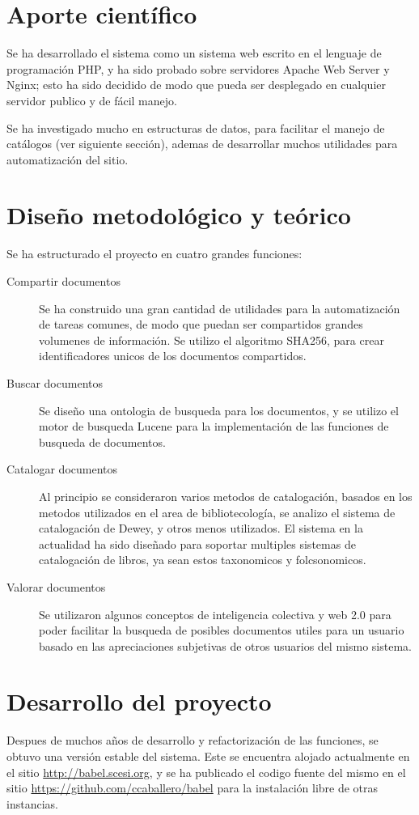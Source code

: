 \documentclass[letter,11pt,oneside,spanish]{article}
\begin{document}
\section{Aporte científico}
Se ha desarrollado el sistema como un sistema web escrito en el lenguaje de programación PHP, y ha 
sido probado sobre servidores Apache Web Server y Nginx; esto ha sido decidido de modo que pueda
ser desplegado en cualquier servidor publico y de fácil manejo.

Se ha investigado mucho en estructuras de datos, para facilitar el manejo de catálogos (ver siguiente
sección), ademas de desarrollar muchos utilidades para automatización del sitio.

\section{Diseño metodológico y teórico}
Se ha estructurado el proyecto en cuatro grandes funciones:

\begin{description}
\item [Compartir documentos]
    Se ha construido una gran cantidad de utilidades para la automatización de tareas comunes,
    de modo que puedan ser compartidos grandes volumenes de información.
    Se utilizo el algoritmo SHA256, para crear identificadores unicos de los documentos compartidos.
\item [Buscar documentos]
    Se diseño una ontologia de busqueda para los documentos, y se utilizo el motor de busqueda Lucene
    para la implementación de las funciones de busqueda de documentos.
\item [Catalogar documentos]
    Al principio se consideraron varios metodos de catalogación, basados en los metodos utilizados en
    el area de bibliotecología, se analizo el sistema de catalogación de Dewey, y otros menos
    utilizados.
    El sistema en la actualidad ha sido diseñado para soportar multiples sistemas de catalogación de
    libros, ya sean estos taxonomicos y folcsonomicos.
\item [Valorar documentos]
    Se utilizaron algunos conceptos de inteligencia colectiva y web 2.0 para poder facilitar la
    busqueda de posibles documentos utiles para un usuario basado en las apreciaciones subjetivas
    de otros usuarios del mismo sistema.
\end{description}

\section{Desarrollo del proyecto}
Despues de muchos años de desarrollo y refactorización de las funciones, se obtuvo una versión
estable del sistema. Este se encuentra alojado actualmente en el sitio \url{http://babel.scesi.org},
y se ha publicado el codigo fuente del mismo en el sitio \url{https://github.com/ccaballero/babel}
para la instalación libre de otras instancias.
\end{document}

